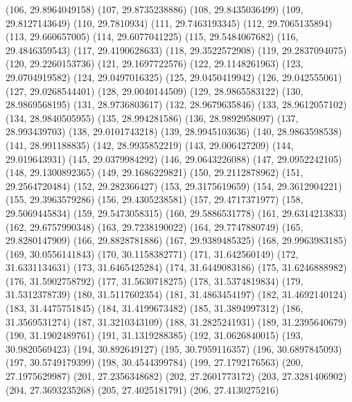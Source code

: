 {					(106, 29.8964049158)
					(107, 29.8735238886)
					(108, 29.8435036499)
					(109, 29.8127143649)
					(110, 29.7810934)
					(111, 29.7463193345)
					(112, 29.7065135894)
					(113, 29.660657005)
					(114, 29.6077041225)
					(115, 29.5484067682)
					(116, 29.4846359543)
					(117, 29.4190628633)
					(118, 29.3522572908)
					(119, 29.2837094075)
					(120, 29.2260153736)
					(121, 29.1697722576)
					(122, 29.1148261963)
					(123, 29.0704919582)
					(124, 29.0497016325)
					(125, 29.0450419942)
					(126, 29.042555061)
					(127, 29.0268544401)
					(128, 29.0040144509)
					(129, 28.9865583122)
					(130, 28.9869568195)
					(131, 28.9736803617)
					(132, 28.9679635846)
					(133, 28.9612057102)
					(134, 28.9840505955)
					(135, 28.994281586)
					(136, 28.9892958097)
					(137, 28.993439703)
					(138, 29.0101743218)
					(139, 28.9945103636)
					(140, 28.9863598538)
					(141, 28.991188835)
					(142, 28.9935852219)
					(143, 29.006427209)
					(144, 29.019643931)
					(145, 29.0379984292)
					(146, 29.0643226088)
					(147, 29.0952242105)
					(148, 29.1300892365)
					(149, 29.1686229821)
					(150, 29.2112878962)
					(151, 29.2564720484)
					(152, 29.282366427)
					(153, 29.3175619659)
					(154, 29.3612904221)
					(155, 29.3963579286)
					(156, 29.4305238581)
					(157, 29.4717371977)
					(158, 29.5069445834)
					(159, 29.5473058315)
					(160, 29.5886531778)
					(161, 29.6314213833)
					(162, 29.6757990348)
					(163, 29.7238190022)
					(164, 29.7747880749)
					(165, 29.8280147909)
					(166, 29.8828781886)
					(167, 29.9389485325)
					(168, 29.9963983185)
					(169, 30.0556141843)
					(170, 30.1158382771)
					(171, 31.642560149)
					(172, 31.6331134631)
					(173, 31.6465425284)
					(174, 31.6449083186)
					(175, 31.6246888982)
					(176, 31.5902758792)
					(177, 31.5630718275)
					(178, 31.5374819834)
					(179, 31.5312378739)
					(180, 31.5117602354)
					(181, 31.4863454197)
					(182, 31.4692140124)
					(183, 31.4475751845)
					(184, 31.4199673482)
					(185, 31.3894997312)
					(186, 31.3569531274)
					(187, 31.3210343109)
					(188, 31.2825241931)
					(189, 31.2395640679)
					(190, 31.1902489761)
					(191, 31.1319288385)
					(192, 31.0626840015)
					(193, 30.9820569423)
					(194, 30.892649127)
					(195, 30.7959116357)
					(196, 30.6897845093)
					(197, 30.5749179399)
					(198, 30.4544399784)
					(199, 27.1792176563)
					(200, 27.1975629987)
					(201, 27.2356348682)
					(202, 27.2601773172)
					(203, 27.3281406902)
					(204, 27.3693235268)
					(205, 27.4025181791)
					(206, 27.4130275216)
}
